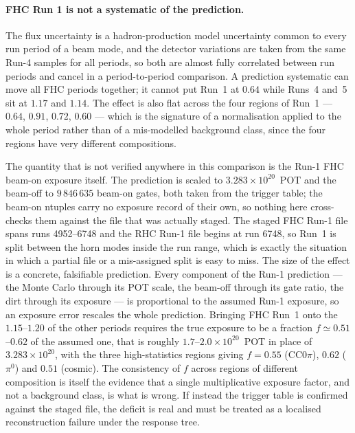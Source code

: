 \documentclass[11pt,a4paper]{article}
\begin{document}
\paragraph{FHC Run 1 is not a systematic of the prediction.}
The flux uncertainty is a hadron-production model uncertainty common to every run period
of a beam mode, and the detector variations are taken from the same Run-4 samples for all
periods, so both are almost fully correlated between run periods and cancel in a
period-to-period comparison. A prediction systematic can move all FHC periods together;
it cannot put Run~1 at $0.64$ while Runs~4 and~5 sit at $1.17$ and $1.14$. The effect is
also flat across the four regions of Run~1 --- $0.64$, $0.91$, $0.72$, $0.60$ --- which is
the signature of a normalisation applied to the whole period rather than of a
mis-modelled background class, since the four regions have very different compositions.

The quantity that is not verified anywhere in this comparison is the Run-1 FHC beam-on
exposure itself. The prediction is scaled to $3.283\times10^{20}$~POT and the beam-off to
$9\,846\,635$ beam-on gates, both taken from the trigger table; the beam-on ntuples carry
no exposure record of their own, so nothing here cross-checks them against the file that
was actually staged. The staged FHC Run-1 file spans runs 4952--6748 and the RHC Run-1
file begins at run 6748, so Run~1 is split between the horn modes inside the run range,
which is exactly the situation in which a partial file or a mis-assigned split is easy to
miss. The size of the effect is a concrete, falsifiable prediction. Every component of the
Run-1 prediction --- the Monte Carlo through its POT scale, the beam-off through its gate
ratio, the dirt through its exposure --- is proportional to the assumed Run-1 exposure, so
an exposure error rescales the whole prediction. Bringing FHC Run~1 onto the
$1.15$--$1.20$ of the other periods requires the true exposure to be a fraction
$f\simeq0.51$--$0.62$ of the assumed one, that is roughly $1.7$--$2.0\times10^{20}$~POT
in place of $3.283\times10^{20}$, with the three high-statistics regions giving
$f=0.55$ (CC$0\pi$), $0.62$ ($\pi^0$) and $0.51$ (cosmic). The consistency of $f$ across
regions of different composition is itself the evidence that a single multiplicative
exposure factor, and not a background class, is what is wrong. If instead the trigger
table is confirmed against the staged file, the deficit is real and must be treated as a
localised reconstruction failure under the response tree.
\end{document}
